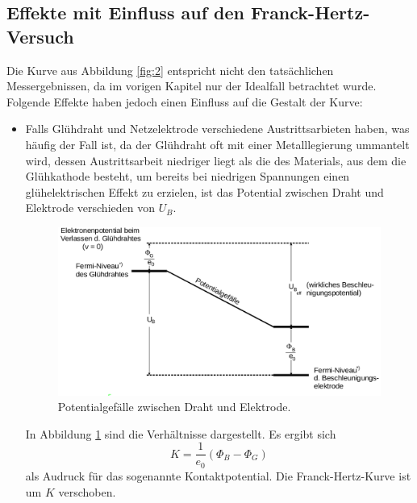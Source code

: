 \subsection{Effekte mit Einfluss auf den Franck-Hertz-Versuch}
Die Kurve aus Abbildung \ref{fig:2} entspricht nicht den tatsächlichen Messergebnissen,
da im vorigen Kapitel nur der Idealfall betrachtet wurde. Folgende Effekte haben jedoch
einen Einfluss auf die Gestalt der Kurve:
\begin{itemize}
  \item Falls Glühdraht und Netzelektrode verschiedene Austrittsarbieten haben, was
  häufig der Fall ist, da der Glühdraht oft mit einer Metalllegierung ummantelt wird, dessen
  Austrittsarbeit niedriger liegt als die des Materials, aus dem die Glühkathode besteht,
  um bereits bei niedrigen Spannungen einen glühelektrischen Effekt zu erzielen, ist das
  Potential zwischen Draht und Elektrode verschieden von $U_B$.
  \begin{figure}[h]
    \centering
    \includegraphics[scale=0.35]{pot.png}
    \caption{Potentialgefälle zwischen Draht und Elektrode. \cite{anleitung}}
    \label{fig:3}
  \end{figure}
  In Abbildung \ref{fig:3} sind die Verhältnisse dargestellt. Es ergibt sich
  \begin{equation}
    K = \frac{1}{e_0} (\Phi_B - \Phi_G)
    \label{eqn:2}
  \end{equation}
  als Audruck für das sogenannte Kontaktpotential. Die Franck-Hertz-Kurve ist um
  $K$ verschoben.


\end{itemize}
